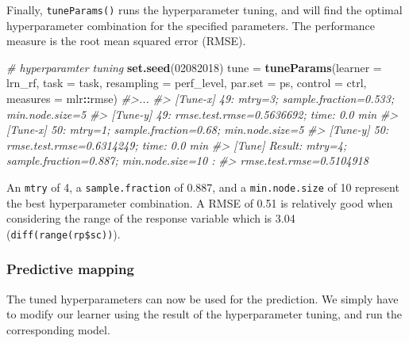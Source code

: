 \documentclass[]{krantz}
\newenvironment{Shaded}{\begin{snugshade}}{\end{snugshade}}
\newcommand{\CommentTok}[1]{\textcolor[rgb]{0.37,0.37,0.37}{\textit{#1}}}
\newcommand{\DataTypeTok}[1]{\textcolor[rgb]{0.27,0.27,0.27}{#1}}
\newcommand{\DecValTok}[1]{\textcolor[rgb]{0.06,0.06,0.06}{#1}}
\newcommand{\KeywordTok}[1]{\textcolor[rgb]{0.27,0.27,0.27}{\textbf{#1}}}
\newcommand{\NormalTok}[1]{#1}
\newcommand{\OperatorTok}[1]{\textcolor[rgb]{0.43,0.43,0.43}{\textbf{#1}}}
\newcommand{\StringTok}[1]{\textcolor[rgb]{0.5,0.5,0.5}{#1}}
\begin{document}
Finally, \texttt{tuneParams()} runs the hyperparameter tuning, and will find the optimal hyperparameter combination for the specified parameters.
The performance measure is the root mean squared error (RMSE).

\begin{Shaded}
\begin{Highlighting}[]
\CommentTok{# hyperparamter tuning}
\KeywordTok{set.seed}\NormalTok{(}\DecValTok{02082018}\NormalTok{)}
\NormalTok{tune =}\StringTok{ }\KeywordTok{tuneParams}\NormalTok{(}\DataTypeTok{learner =}\NormalTok{ lrn_rf, }
                  \DataTypeTok{task =}\NormalTok{ task,}
                  \DataTypeTok{resampling =}\NormalTok{ perf_level,}
                  \DataTypeTok{par.set =}\NormalTok{ ps,}
                  \DataTypeTok{control =}\NormalTok{ ctrl, }
                  \DataTypeTok{measures =}\NormalTok{ mlr}\OperatorTok{::}\NormalTok{rmse)}
\CommentTok{#>...}
\CommentTok{#> [Tune-x] 49: mtry=3; sample.fraction=0.533; min.node.size=5}
\CommentTok{#> [Tune-y] 49: rmse.test.rmse=0.5636692; time: 0.0 min}
\CommentTok{#> [Tune-x] 50: mtry=1; sample.fraction=0.68; min.node.size=5}
\CommentTok{#> [Tune-y] 50: rmse.test.rmse=0.6314249; time: 0.0 min}
\CommentTok{#> [Tune] Result: mtry=4; sample.fraction=0.887; min.node.size=10 :}
\CommentTok{#> rmse.test.rmse=0.5104918}
\end{Highlighting}
\end{Shaded}

An \texttt{mtry} of 4, a \texttt{sample.fraction} of 0.887, and a \texttt{min.node.size} of 10 represent the best hyperparameter combination.
A RMSE of 0.51 is relatively good when considering the range of the response variable which is 3.04 (\texttt{diff(range(rp\$sc))}).

\hypertarget{predictive-mapping}{%
\subsubsection{Predictive mapping}\label{predictive-mapping}}

The tuned hyperparameters can now be used for the prediction.
We simply have to modify our learner using the result of the hyperparameter tuning, and run the corresponding model.
\end{document}
